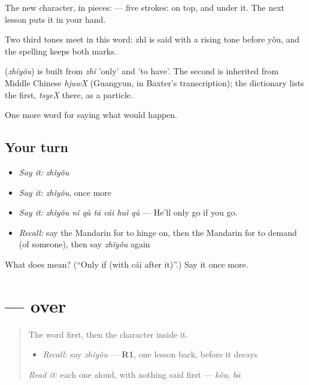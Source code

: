 The new character, in pieces:  — five strokes:  on top, and  under it. The next lesson puts it in your hand.

Two third tones meet in this word: zhǐ is said with a rising tone before yǒu, and the spelling keeps both marks.

\begin{cousinweb}
\textbf{} (\emph{zhǐyǒu}) is built from \emph{zhǐ} 'only' and  'to have'. The second is inherited from Middle Chinese \emph{hjuwX} (Guangyun, in Baxter's transcription); the dictionary lists the first, \emph{tsyeX} there, as a particle.
\end{cousinweb}

\begin{grammarlens}[title={What you've built}]
One more word for saying what would happen.
\end{grammarlens}

\subsection*{Your turn}
\begin{itemize}
\raggedright
  \item \emph{Say it:} \emph{zhǐyǒu}
  \item \emph{Say it:} \emph{zhǐyǒu}, once more
  \item \emph{Say it:} \emph{zhǐyǒu nǐ qù tā cái huì qù} — He'll only go if you go.
  \item \emph{Recall:} say the Mandarin for to hinge on, then the Mandarin for to demand (of someone), then say \emph{zhǐyǒu} again
\end{itemize}

\begin{tcolorbox}[breakable,colback=teal!4,colframe=teal!35!black,title={Before you move on}]
What does  mean? (\textquotedblleft{}Only if (with cái after it)\textquotedblright{}.) Say it once more.
\end{tcolorbox}
\section[\texorpdfstring{\zh{只} (zhǐ)}{只 (zhǐ)}]{ —  over }

\label{lesson:ZH-W399-zhi-only}



\begin{quote}
The word first, then the character inside it.

\begin{itemize}
\raggedright
  \item \emph{Recall:} say \emph{zhǐyǒu} — \textbf{R1}, one lesson back, before it decays
\end{itemize}

\begin{quote}
 
\end{quote}

\emph{Read it:} each one aloud, with nothing said first — \emph{kǒu}, \emph{bā}
\end{quote}


